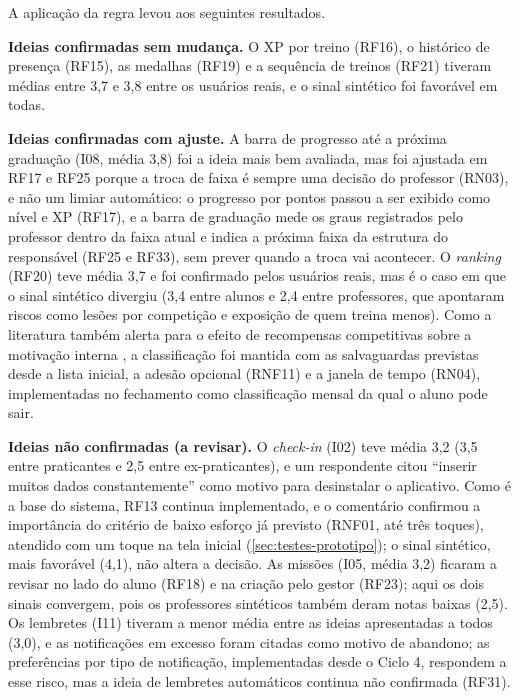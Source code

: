 A aplicação da regra levou aos seguintes resultados.

\textbf{Ideias confirmadas sem mudança.} O XP por treino (RF16), o
histórico de presença (RF15), as medalhas (RF19) e a sequência de treinos
(RF21) tiveram médias entre 3,7 e 3,8 entre os usuários reais, e o sinal
sintético foi favorável em todas.

\textbf{Ideias confirmadas com ajuste.} A barra de progresso até a
próxima graduação (I08, média 3,8) foi a ideia mais bem avaliada, mas foi
ajustada em RF17 e RF25 porque a troca de faixa é sempre uma decisão do
professor (RN03), e não um limiar automático: o progresso por pontos
passou a ser exibido como nível e XP (RF17), e a barra de graduação mede
os graus registrados pelo professor dentro da faixa atual e indica a
próxima faixa da estrutura do responsável (RF25 e RF33), sem prever
quando a troca vai acontecer. O \textit{ranking} (RF20) teve média 3,7 e
foi confirmado pelos usuários reais, mas é o caso em que o sinal
sintético divergiu (3,4 entre alunos e 2,4 entre professores, que
apontaram riscos como lesões por competição e exposição de quem treina
menos). Como a literatura também alerta para o efeito de recompensas
competitivas sobre a motivação interna \cite{ryan2000}, a classificação
foi mantida com as salvaguardas previstas desde a lista inicial, a adesão
opcional (RNF11) e a janela de tempo (RN04), implementadas no fechamento
como classificação mensal da qual o aluno pode sair.

\textbf{Ideias não confirmadas (a revisar).} O \textit{check-in} (I02)
teve média 3,2 (3,5 entre praticantes e 2,5 entre ex-praticantes), e um
respondente citou ``inserir muitos dados constantemente'' como motivo
para desinstalar o aplicativo. Como é a base do sistema, RF13 continua
implementado, e o comentário confirmou a importância do critério de
baixo esforço já previsto (RNF01, até três toques), atendido com um toque
na tela inicial (\autoref{sec:testes-prototipo}); o sinal sintético, mais
favorável (4,1), não altera a decisão. As missões (I05, média 3,2)
ficaram a revisar no lado do aluno (RF18) e na criação pelo gestor
(RF23); aqui os dois sinais convergem, pois os professores sintéticos
também deram notas baixas (2,5). Os lembretes (I11) tiveram a menor
média entre as ideias apresentadas a todos (3,0), e as notificações em
excesso foram citadas como motivo de abandono; as preferências por tipo
de notificação, implementadas desde o Ciclo 4, respondem a esse risco,
mas a ideia de lembretes automáticos continua não confirmada (RF31).

